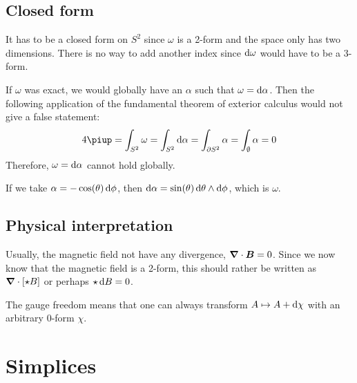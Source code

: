 \documentclass[11pt, english, fleqn, DIV=15, headinclude, BCOR=1cm]{scrartcl}
\begin{document}
\subsection{Closed form}

It has to be a closed form on $S^2$ since $\omega$ is a 2-form and the space
only has two dimensions. There is no way to add another index since $\mathop{}\!\mathrm d
\omega$ would have to be a 3-form.

If $\omega$ was exact, we would globally have an $\alpha$ such that $\omega =
\mathop{}\!\mathrm d\alpha$. Then the following application of the fundamental theorem of
exterior calculus would not give a false statement:
\[
    4 \piup = \int_{S^2} \omega = \int_{S^2} \dif \alpha = \int_{\partial S^2}
    \alpha = \int_\emptyset \alpha = 0
\]
Therefore, $\omega = \mathop{}\!\mathrm d\alpha$ cannot hold globally.

If we take $\alpha = - \cos(\theta) \mathop{}\!\mathrm d \phi$, then $\mathop{}\!\mathrm d \alpha =
\sin(\theta) \mathop{}\!\mathrm d \theta \wedge \mathop{}\!\mathrm d \phi$, which is $\omega$.

\subsection{Physical interpretation}

Usually, the magnetic field not have any divergence, $\boldsymbol{\nabla} \cdot \boldsymbol{B} =
0$. Since we now know that the magnetic field is a 2-form, this should rather
be written as $\boldsymbol{\nabla} \cdot [\star B]$ or perhaps $\star \mathop{}\!\mathrm d B = 0$.

The gauge freedom means that one can always transform $A \mapsto A + \mathop{}\!\mathrm d \chi$
with an arbitrary 0-form $\chi$.

\section{Simplices}
\label{homework:3}
\end{document}
